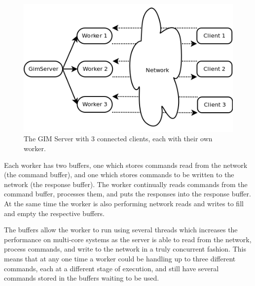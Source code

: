 \begin{figure}[!h]
    \begin{center}
        \includegraphics[scale=0.6]{Design/diagrams/server_workers.png}
        \caption{The GIM Server with 3 connected clients, each with their own worker.}
        \label{WorkersDia}
    \end{center}
\end{figure}

Each worker has two buffers, one which stores commands read from the network (the command buffer), and one which stores commands to be written to the network (the response buffer). The worker continually reads commands from the command buffer, processes them, and puts the responses into the response buffer. At the same time the worker is also performing network reads and writes to fill and empty the respective buffers.

The buffers allow the worker to run using several threads which increases the performance on multi-core systems as the server is able to read from the network, process commands, and write to the network in a truly concurrent fashion. This means that at any one time a worker could be handling up to three different commands, each at a different stage of execution, and still have several commands stored in the buffers waiting to be used.

